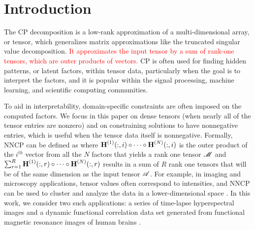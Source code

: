 
\section{Introduction}

The CP decomposition is a low-rank approximation of a multi-dimensional array, or tensor, which generalizes matrix approximations like the truncated singular value decomposition.
\textcolor{red}{It approximates the input tensor by a sum of rank-one tensors, which are outer products of vectors. }
CP is often used for finding hidden patterns, or latent factors, within tensor data, particularly when the goal is to interpret the factors, and it is popular within the signal processing, machine learning, and scientific computing communities.



To aid in interpretability, domain-specific constraints are often imposed on the computed factors.
We focus in this paper on dense tensors (when nearly all of the tensor entries are nonzero) and on constraining solutions to have nonnegative entries, which is useful when the tensor data itself is nonnegative. Formally, NNCP can be defined as
where $\Mn{H}{1}(:,i) \circ \cdots \circ \Mn{H}{N}(:,i)$ is the outer product of the $i^{th}$ vector from all the $N$ factors that yields a rank one tensor $\T{M}$ and $\sum_{r=1}^R \Mn{H}{1}(:,r) \circ \cdots \circ \Mn{H}{N}(:,r)$ results in a sum of $R$ rank one tensors that will be of the same dimension as the input tensor $\TA$. 
For example, in imaging and microscopy applications, tensor values often correspond to intensities, and NNCP can be used to cluster and analyze the data in a lower-dimensional space \cite{JC+16}.
In this work, we consider two such applications: a series of time-lapse hyperspectral images \cite{FAN16} and a dynamic functional correlation data set generated from functional magnetic resonance images of human brains \cite{VEU+12}.

